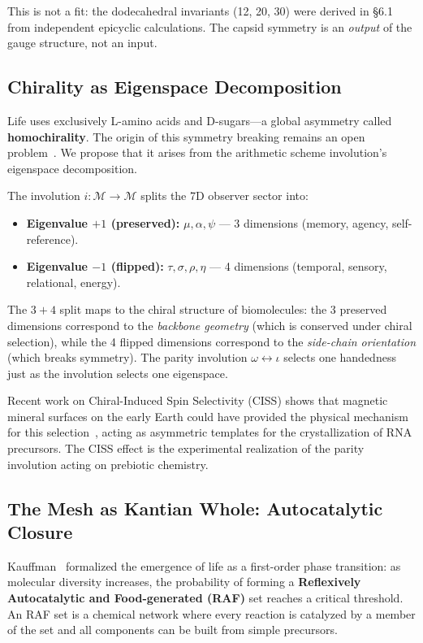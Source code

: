 This is not a fit: the dodecahedral invariants (12, 20, 30) were derived in \S6.1 from independent epicyclic calculations. The capsid symmetry is an \emph{output} of the gauge structure, not an input.

\subsection{Chirality as Eigenspace Decomposition}

Life uses exclusively L-amino acids and D-sugars---a global asymmetry called \textbf{homochirality}. The origin of this symmetry breaking remains an open problem~\cite{blackmond2024}. We propose that it arises from the arithmetic scheme involution's eigenspace decomposition.

The involution $i: \mathcal{M} \to \mathcal{M}$ splits the 7D observer sector into:
\begin{itemize}
    \item \textbf{Eigenvalue $+1$ (preserved):} $\mu, \alpha, \psi$ --- 3 dimensions (memory, agency, self-reference).
    \item \textbf{Eigenvalue $-1$ (flipped):} $\tau, \sigma, \rho, \eta$ --- 4 dimensions (temporal, sensory, relational, energy).
\end{itemize}

The $3 + 4$ split maps to the chiral structure of biomolecules: the 3 preserved dimensions correspond to the \emph{backbone geometry} (which is conserved under chiral selection), while the 4 flipped dimensions correspond to the \emph{side-chain orientation} (which breaks symmetry). The parity involution $\omega \leftrightarrow \iota$ selects one handedness just as the involution selects one eigenspace.

Recent work on Chiral-Induced Spin Selectivity (CISS) shows that magnetic mineral surfaces on the early Earth could have provided the physical mechanism for this selection~\cite{tassinari2019}, acting as asymmetric templates for the crystallization of RNA precursors. The CISS effect is the experimental realization of the parity involution acting on prebiotic chemistry.

\subsection{The Mesh as Kantian Whole: Autocatalytic Closure}

Kauffman~\cite{kauffman2024} formalized the emergence of life as a first-order phase transition: as molecular diversity increases, the probability of forming a \textbf{Reflexively Autocatalytic and Food-generated (RAF)} set reaches a critical threshold. An RAF set is a chemical network where every reaction is catalyzed by a member of the set and all components can be built from simple precursors.

